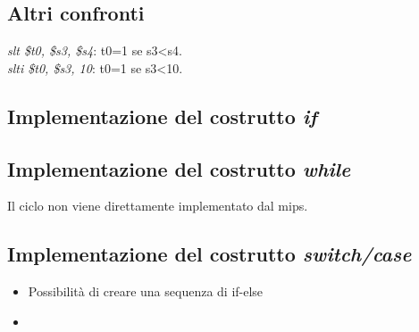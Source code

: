 \documentclass[class=book, crop=false]{standalone}
\begin{document}
\subsection{Altri confronti}
\emph{slt \$t0, \$s3, \$s4}: t0=1 se s3<s4.\\
\emph{slti \$t0, \$s3, 10}: t0=1 se s3<10.\\


\subsection{Implementazione del costrutto \emph{if}}

\subsection{Implementazione del costrutto \emph{while}}
Il ciclo non viene direttamente implementato dal mips.\\

\subsection{Implementazione del costrutto \emph{switch/case}}
\begin{itemize}
	\item Possibilità di creare una sequenza di if-else
	\item
\end{itemize}
\end{document}
